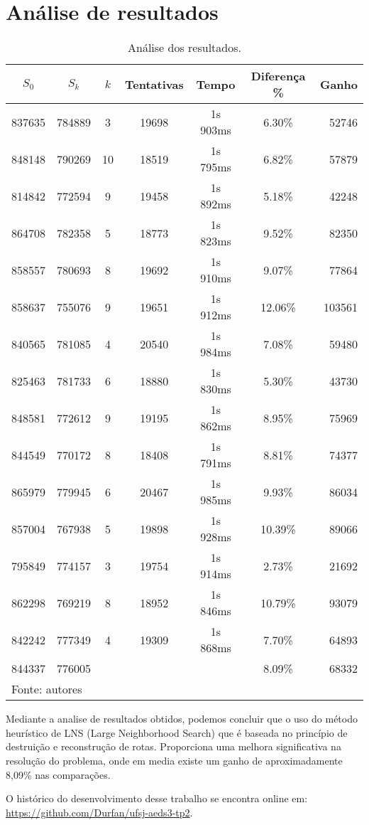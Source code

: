 \documentclass[12pt,a4paper]{article}
\renewcommand*{\arraystretch}{1.2}
\begin{document}
\section{Análise de resultados}

\begin{table}[H]
	\renewcommand{\arraystretch}{1}
	\centering
	\caption{Análise dos resultados.}
	\label{tab:resultados}
	\begin{tabular}{*{6}{c} r}
		\toprule 
		$S_{0}$ & $S_{k}$ & $k$ & Tentativas & Tempo & Diferença \% & Ganho \\ 
		\midrule
		837635 & 784889 &  3 & 19698 & 1s 903ms &  6.30\% &  52746 \\
		848148 & 790269 & 10 & 18519 & 1s 795ms &  6.82\% &  57879 \\
		814842 & 772594 &  9 & 19458 & 1s 892ms &  5.18\% &  42248 \\
		864708 & 782358 &  5 & 18773 & 1s 823ms &  9.52\% &  82350 \\
		858557 & 780693 &  8 & 19692 & 1s 910ms &  9.07\% &  77864 \\
		858637 & 755076 &  9 & 19651 & 1s 912ms & 12.06\% & 103561 \\
		840565 & 781085 &  4 & 20540 & 1s 984ms &  7.08\% &  59480 \\
		825463 & 781733 &  6 & 18880 & 1s 830ms &  5.30\% &  43730 \\
		848581 & 772612 &  9 & 19195 & 1s 862ms &  8.95\% &  75969 \\
		844549 & 770172 &  8 & 18408 & 1s 791ms &  8.81\% &  74377 \\
		865979 & 779945 &  6 & 20467 & 1s 985ms &  9.93\% &  86034 \\
		857004 & 767938 &  5 & 19898 & 1s 928ms & 10.39\% &  89066 \\
		795849 & 774157 &  3 & 19754 & 1s 914ms &  2.73\% &  21692 \\
		862298 & 769219 &  8 & 18952 & 1s 846ms & 10.79\% &  93079 \\
		842242 & 777349 &  4 & 19309 & 1s 868ms &  7.70\% &  64893 \\
		\midrule
		844337 & 776005 &    &       &          &  8.09\% &  68332 \\
		\bottomrule
		\multicolumn{6}{l}{\footnotesize Fonte: autores}
	\end{tabular}
\end{table}

Mediante a analise de resultados obtidos, podemos concluir que o uso do método heurístico de LNS (Large Neighborhood Search) que é baseada no princípio de destruição e reconstrução de rotas. Proporciona uma melhora significativa na resolução do problema, onde em media existe um ganho de aproximadamente 8,09\% nas comparações.

\pagebreak

\begin{flushleft}
	\nocite{*}
	
	\vfill
	O histórico do desenvolvimento desse trabalho se encontra online em:\\ \url{https://github.com/Durfan/ufsj-aeds3-tp2}.
\end{flushleft}
\end{document}
